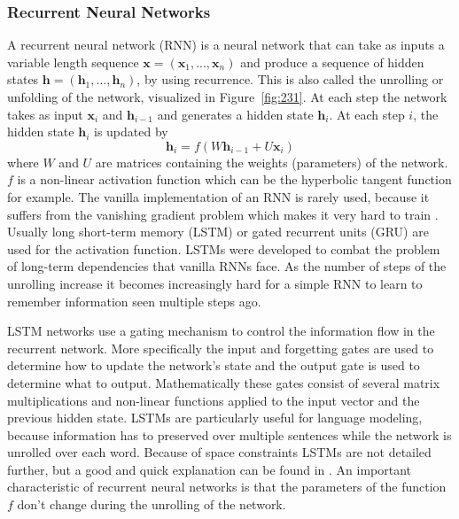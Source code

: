 \documentclass[12pt]{article}
\begin{document}
\subsubsection{Recurrent Neural Networks} \label{sssec:231}
A recurrent neural network (RNN) \cite{RNN:1988} is a neural network that can take as inputs a variable length sequence \(\bm{x}=(\bm{x}_1,...,\bm{x}_n)\) and produce a sequence of hidden states \(\bm{h}=(\bm{h}_1,...,\bm{h}_n)\), by using recurrence. This is also called the unrolling or unfolding of the network, visualized in Figure~\ref{fig:231}. At each step the network takes as input \(\bm{x}_i\) and \(\bm{h}_{i-1}\) and generates a hidden state \(\bm{h}_i\). At each step \(i\), the hidden state \(\bm{h}_i\) is updated by
\begin{equation} \label{eq231a}
\bm{h}_i=f(W\bm{h}_{i-1}+U\bm{x}_i)
\end{equation}
where \(W\) and \(U\) are matrices containing the weights (parameters) of the network. \(f\) is a non-linear activation function which can be the hyperbolic tangent function for example. The vanilla implementation of an RNN is rarely used, because it suffers from the vanishing gradient problem which makes it very hard to train \cite{Hochreiter:1998}. Usually long short-term memory (LSTM) \cite{Hochreiter:1997} or gated recurrent units (GRU) \cite{Cho:2014} are used for the activation function. LSTMs were developed to combat the problem of long-term dependencies that vanilla RNNs face. As the number of steps of the unrolling increase it becomes increasingly hard for a simple RNN to learn to remember information seen multiple steps ago. 

LSTM networks use a gating mechanism to control the information flow in the recurrent network. More specifically the input and forgetting gates are used to determine how to update the network's state and the output gate is used to determine what to output. Mathematically these gates consist of several matrix multiplications and non-linear functions applied to the input vector and the previous hidden state. LSTMs are particularly useful for language modeling, because information has to preserved over multiple sentences while the network is unrolled over each word. Because of space constraints LSTMs are not detailed further, but a good and quick explanation can be found in \cite{LSTM_article}. An important characteristic of recurrent neural networks is that the parameters of the function \(f\) don't change during the unrolling of the network.
\end{document}
